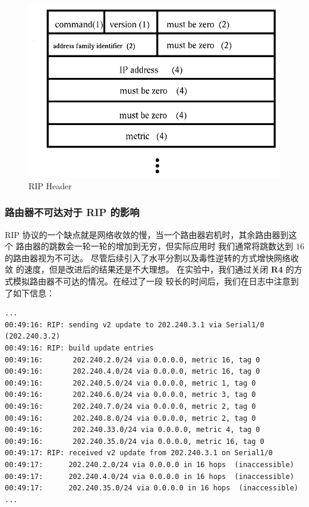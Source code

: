 \documentclass[black,normal,cn]{elegantnote}
\begin{document}
\begin{figure}[!htbp]
    \centering
    \includegraphics[width=.8\textwidth]{format}
    \caption{RIP Header}
    \label{fig:RIPHeader}
\end{figure}

\subsubsection{路由器不可达对于 RIP 的影响}

RIP 协议的一个缺点就是网络收敛的慢，当一个路由器宕机时，其余路由器到这个
路由器的跳数会一轮一轮的增加到无穷，但实际应用时
我们通常将跳数达到 16 的路由器视为不可达。
尽管后续引入了水平分割以及毒性逆转的方式增快网络收敛
的速度，但是改进后的结果还是不大理想。
在实验中，我们通过关闭 \textbf{R4} 的方式模拟路由器不可达的情况。在经过了一段
较长的时间后，我们在日志中注意到了如下信息：

\begin{lstlisting}
...
00:49:16: RIP: sending v2 update to 202.240.3.1 via Serial1/0 (202.240.3.2)
00:49:16: RIP: build update entries
00:49:16:       202.240.2.0/24 via 0.0.0.0, metric 16, tag 0
00:49:16:       202.240.4.0/24 via 0.0.0.0, metric 16, tag 0
00:49:16:       202.240.5.0/24 via 0.0.0.0, metric 1, tag 0
00:49:16:       202.240.6.0/24 via 0.0.0.0, metric 3, tag 0
00:49:16:       202.240.7.0/24 via 0.0.0.0, metric 2, tag 0
00:49:16:       202.240.8.0/24 via 0.0.0.0, metric 2, tag 0
00:49:16:       202.240.33.0/24 via 0.0.0.0, metric 4, tag 0
00:49:16:       202.240.35.0/24 via 0.0.0.0, metric 16, tag 0
00:49:17: RIP: received v2 update from 202.240.3.1 on Serial1/0
00:49:17:      202.240.2.0/24 via 0.0.0.0 in 16 hops  (inaccessible)
00:49:17:      202.240.4.0/24 via 0.0.0.0 in 16 hops  (inaccessible)
00:49:17:      202.240.35.0/24 via 0.0.0.0 in 16 hops  (inaccessible)
... 
\end{lstlisting}
\end{document}
